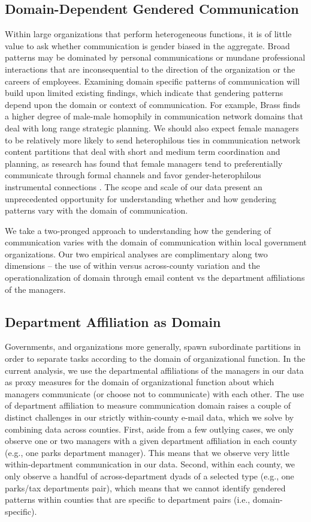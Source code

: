 \documentclass{pnastwo}
\begin{document}
\begin{article}
\section{Domain-Dependent Gendered Communication}
Within large organizations that perform heterogeneous functions, it is of little value to ask whether communication is gender biased in the aggregate. Broad patterns may be dominated by personal communications or mundane professional interactions that are inconsequential to the direction of the organization or the careers of employees. Examining domain specific patterns of communication will build upon limited existing findings, which indicate that gendering patterns depend upon the domain or context of communication. For example, Brass \citep{Brass1985} finds a higher degree of male-male homophily in communication network domains that deal with long range strategic planning. We should also expect female managers to be relatively more likely to send heterophilous ties in communication network content partitions that deal with short and medium term coordination and planning, as research has found that female managers tend to preferentially communicate through formal channels  \citep{Ragins1989} and favor gender-heterophilous instrumental connections \citep{Ibarra1992}. The scope and scale of our data present an unprecedented opportunity for understanding whether and how gendering patterns vary with the domain of communication.

We take a two-pronged approach to understanding how the gendering of communication varies with the domain of communication within local government organizations. Our two empirical analyses are complimentary along two dimensions -- the use of within versus across-county variation and the operationalization of domain through email content vs the department affiliations of the managers. 

\subsection{Department Affiliation as Domain}

Governments, and organizations more generally, spawn subordinate partitions in order to separate tasks according to the domain of organizational function. In the current analysis, we use the departmental affiliations of the managers in our data as proxy measures for the domain of organizational function about which managers communicate (or choose not to communicate) with each other. The use of department affiliation to measure communication domain raises a couple of distinct challenges in our strictly within-county e-mail data, which we solve by combining data across counties. First, aside from a few outlying cases, we only observe one or two managers with a given department affiliation in each county (e.g., one parks department manager). This means that we observe very little within-department communication in our data. Second, within each county, we only observe a handful of across-department dyads of a selected type (e.g., one parks/tax departments pair), which means that we cannot identify gendered patterns within counties that are specific to department pairs (i.e., domain-specific).


\end{article}
\end{document}
